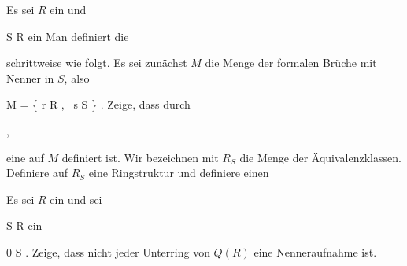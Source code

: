 \setcounter{section}{13}







{}
{





Es sei $R$ ein
und

\mavergleichskette
{\vergleichskette
{ S
}
{ \subseteq }{ R
}
{  }{
}
{    }{
}
{   }{
}
}
{}{}{}
ein
Man definiert die

 {  }

schrittweise wie folgt. Es sei zunächst $M$ die Menge der formalen Brüche mit Nenner in $S$, also

\mavergleichskettedisp
{\vergleichskette
{M
}
{ =} { \left\{     \mid   r \in R , \,  s \in S       \right\}
}
{ } {
}
{ } {
}
{ } {
}
}
{}{}{.}
Zeige, dass durch

 { , }

eine
auf $M$ definiert ist. Wir bezeichnen mit $R_S$ die Menge der Äquivalenzklassen. Definiere auf $R_S$ eine Ringstruktur und definiere einen






}
{} {}

{}
{





Es sei $R$ ein
und sei

\mavergleichskette
{\vergleichskette
{S
}
{ \subseteq }{ R
}
{  }{
}
{    }{
}
{   }{
}
}
{}{}{}
ein

\mavergleichskette
{\vergleichskette
{ 0
}
{ \notin }{S
}
{  }{
}
{    }{
}
{   }{
}
}
{}{}{.}
 {Zeige, dass nicht jeder Unterring von $Q(R)$ eine Nenneraufnahme ist.}





}
{} {}

